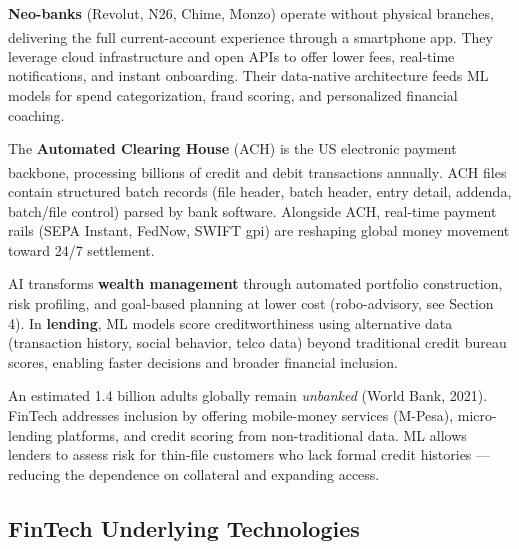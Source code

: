 \begin{tcbitemize}[ skin=sectionraster ]

    \tcbitem[title=Neo-Banks and Digital-Only Banking, raster multicolumn=3]
    \textbf{Neo-banks} (Revolut, N26, Chime, Monzo) operate without physical branches, delivering the full current-account experience through a smartphone app\textsuperscript{\cite[][p.~5]{kardellBuildFinancialSoftware2025}}.
    They leverage cloud infrastructure and open APIs to offer lower fees, real-time notifications, and instant onboarding.
    Their data-native architecture feeds ML models for spend categorization, fraud scoring, and personalized financial coaching.

    \tcbitem[title=Payments and the ACH Network, raster multicolumn=3]
    The \textbf{Automated Clearing House} (ACH) is the US electronic payment backbone, processing billions of credit and debit transactions annually\textsuperscript{\cite[][pp.~5--6]{kardellBuildFinancialSoftware2025}}.
    ACH files contain structured batch records (file header, batch header, entry detail, addenda, batch/file control) parsed by bank software.
    Alongside ACH, real-time payment rails (SEPA Instant, FedNow, SWIFT gpi) are reshaping global money movement toward 24/7 settlement.

    \tcbitem[title={Wealth Management and Lending}, raster multicolumn=3]
    AI transforms \textbf{wealth management} through automated portfolio construction, risk profiling, and goal-based planning at lower cost (robo-advisory, see Section 4).
    In \textbf{lending}, ML models score creditworthiness using alternative data (transaction history, social behavior, telco data) beyond traditional credit bureau scores, enabling faster decisions and broader financial inclusion.

    \tcbitem[title=Financial Inclusion, raster multicolumn=3]
    An estimated 1.4 billion adults globally remain \emph{unbanked} (World Bank, 2021).
    FinTech addresses inclusion by offering mobile-money services (M-Pesa), micro-lending platforms, and credit scoring from non-traditional data.
    ML allows lenders to assess risk for thin-file customers who lack formal credit histories — reducing the dependence on collateral and expanding access.

\end{tcbitemize}

\subsection{FinTech Underlying Technologies}

